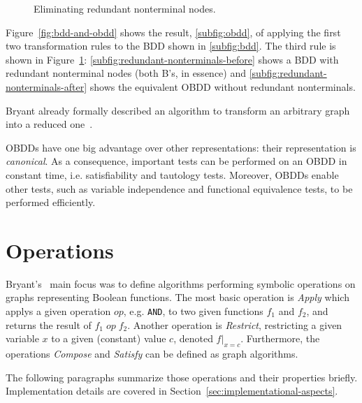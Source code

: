 \documentclass{vldb}
\begin{document}
\begin{figure}[ht]
    \centering
    \subfigure[]{
        
        \label{subfig:redundant-nonterminals-before}
    }
    \hskip1cm
    \subfigure[]{
        
        \label{subfig:redundant-nonterminals-after}
    }
    \caption{Eliminating redundant nonterminal nodes.}
    \label{fig:redundant-nonterminals}
\end{figure}

Figure~\ref{fig:bdd-and-obdd} shows the result, \ref{subfig:obdd}, of applying
the first two transformation rules to the BDD shown in \ref{subfig:bdd}.
The third rule is shown in Figure~\ref{fig:redundant-nonterminals}:
\ref{subfig:redundant-nonterminals-before} shows a BDD with redundant
nonterminal nodes (both B's, in essence) and
\ref{subfig:redundant-nonterminals-after} shows the equivalent OBDD without
redundant nonterminals.

Bryant already formally described an algorithm to transform an arbitrary graph
into a reduced one~\cite[p. 683]{BRYANT86}. 

OBDDs have one big advantage over other representations: their representation is
\textit{canonical}. As a consequence, important tests can be performed on an OBDD
in constant time, i.e. satisfiability and tautology tests. Moreover, OBDDs enable
other tests, such as variable independence and functional equivalence tests, to
be performed efficiently.

\section{Operations}
\label{sec:operations}

Bryant's~\cite{BRYANT86, BRYANT92} main focus was to define algorithms performing
symbolic operations on graphs representing Boolean functions. The most basic
operation is \textit{Apply} which applys a given operation $op$, e.g. \texttt{AND},
to two given functions $f_1$ and $f_2$, and returns the result of $f_1\;op\;f_2$.
Another operation is \textit{Restrict}, restricting a given variable $x$ to a
given (constant) value $c$, denoted $f|_{x=c}$. Furthermore, the
operations \textit{Compose} and \textit{Satisfy} can be defined as graph
algorithms.

The following paragraphs summarize those operations and their properties briefly.
Implementation details are covered in Section~\ref{sec:implementational-aspects}.
\end{document}
